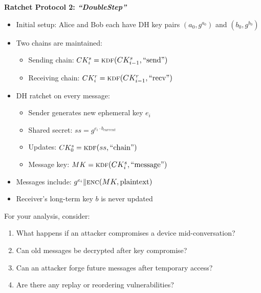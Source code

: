 \documentclass[10pt,a4paper,american]{article}
\begin{document}
\begin{enumerate}
	      \textbf{Ratchet Protocol 2: \textit{``DoubleStep''}}
	      \begin{itemize}
		      \item Initial setup: Alice and Bob each have DH key pairs $(a_0, g^{a_0})$ and $(b_0, g^{b_0})$
		      \item Two chains are maintained:
		            \begin{itemize}
			            \item Sending chain: $CK^s_i = \func{kdf}{CK^s_{i-1}, \text{``send''}}$
			            \item Receiving chain: $CK^r_i = \func{kdf}{CK^r_{i-1}, \text{``recv''}}$
		            \end{itemize}
		      \item DH ratchet on every message:
		            \begin{itemize}
			            \item Sender generates new ephemeral key $e_i$
			            \item Shared secret: $ss = g^{e_i \cdot b_{current}}$
			            \item Updates: $CK^s_0 = \func{kdf}{ss, \text{``chain''}}$
			            \item Message key: $MK = \func{kdf}{CK^s_i, \text{``message''}}$
		            \end{itemize}
		      \item Messages include: $g^{e_i} \| \func{enc}{MK, \text{plaintext}}$
		      \item Receiver's long-term key $b$ is never updated
	      \end{itemize}

	      For your analysis, consider:
	      \begin{enumerate}
		      \item What happens if an attacker compromises a device mid-conversation?
		      \item Can old messages be decrypted after key compromise?
		      \item Can an attacker forge future messages after temporary access?
		      \item Are there any replay or reordering vulnerabilities?
	      \end{enumerate}
\end{enumerate}
\end{document}
